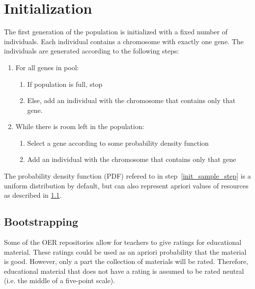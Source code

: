 \section{Initialization}
\label{sec:approach_initialization}
The first generation of the population is initialized with a fixed number of
individuals. Each individual contains a chromosome with exactly one gene. The
individuals are generated according to the following steps:
\begin{enumerate}
	\item For all genes in pool:
		\begin{enumerate}
			\item If population is full, stop
			\item Else, add an individual with the chromosome that contains only that gene.
		\end{enumerate}
	\item While there is room left in the population:
		\begin{enumerate}
			\item \label{init_sample_step}Select a gene according to some probability density function
			\item Add an individual with the chromosome that contains only that
				gene
		\end{enumerate}
\end{enumerate}
The probability density function (PDF) refered to in
step~\ref{init_sample_step} is a uniform distribution by default, but can also
represent apriori values of resources as described in
\ref{sec:approach_bootstrapping}.
\subsection{Bootstrapping}
\label{sec:approach_bootstrapping}
Some of the OER repositories allow for teachers to give ratings for educational
material. These ratings could be used as an apriori probability that the
material is good. However, only a part the collection of materials will be
rated. Therefore, educational material that does not have a rating is assumed
to be rated neutral (i.e. the middle of a five-point scale).

